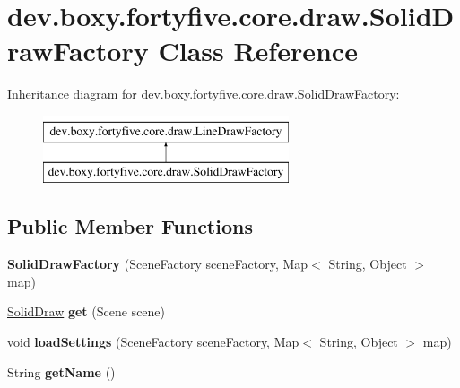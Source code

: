 \hypertarget{classdev_1_1boxy_1_1fortyfive_1_1core_1_1draw_1_1_solid_draw_factory}{
\section{dev.boxy.fortyfive.core.draw.SolidDrawFactory Class Reference}
\label{de/d7a/classdev_1_1boxy_1_1fortyfive_1_1core_1_1draw_1_1_solid_draw_factory}
}
Inheritance diagram for dev.boxy.fortyfive.core.draw.SolidDrawFactory:\begin{figure}[H]
\begin{center}
\leavevmode
\includegraphics[height=2.000000cm]{de/d7a/classdev_1_1boxy_1_1fortyfive_1_1core_1_1draw_1_1_solid_draw_factory}
\end{center}
\end{figure}
\subsection*{Public Member Functions}
\begin{DoxyCompactItemize}
\item 
\hypertarget{classdev_1_1boxy_1_1fortyfive_1_1core_1_1draw_1_1_solid_draw_factory_ae0579210469a819590561890fdefa4e4}{
{\bfseries SolidDrawFactory} (SceneFactory sceneFactory, Map$<$ String, Object $>$ map)}
\label{de/d7a/classdev_1_1boxy_1_1fortyfive_1_1core_1_1draw_1_1_solid_draw_factory_ae0579210469a819590561890fdefa4e4}

\item 
\hypertarget{classdev_1_1boxy_1_1fortyfive_1_1core_1_1draw_1_1_solid_draw_factory_a96ea0e5eef84743301b97d91bb7b130b}{
\hyperlink{classdev_1_1boxy_1_1fortyfive_1_1core_1_1draw_1_1_solid_draw}{SolidDraw} {\bfseries get} (Scene scene)}
\label{de/d7a/classdev_1_1boxy_1_1fortyfive_1_1core_1_1draw_1_1_solid_draw_factory_a96ea0e5eef84743301b97d91bb7b130b}

\item 
\hypertarget{classdev_1_1boxy_1_1fortyfive_1_1core_1_1draw_1_1_solid_draw_factory_ae8314952967e0ed744ce7bf87f6830be}{
void {\bfseries loadSettings} (SceneFactory sceneFactory, Map$<$ String, Object $>$ map)}
\label{de/d7a/classdev_1_1boxy_1_1fortyfive_1_1core_1_1draw_1_1_solid_draw_factory_ae8314952967e0ed744ce7bf87f6830be}

\item 
\hypertarget{classdev_1_1boxy_1_1fortyfive_1_1core_1_1draw_1_1_solid_draw_factory_a7b3dd62763697a418f85576cc2830384}{
String {\bfseries getName} ()}
\label{de/d7a/classdev_1_1boxy_1_1fortyfive_1_1core_1_1draw_1_1_solid_draw_factory_a7b3dd62763697a418f85576cc2830384}

\end{DoxyCompactItemize}
